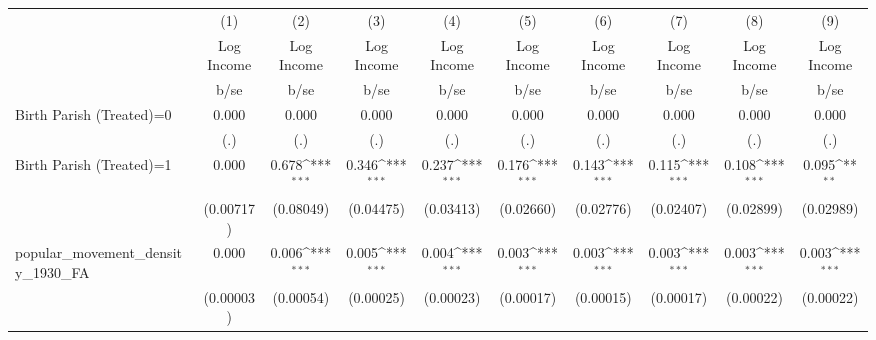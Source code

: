 {
\def\sym#1{\ifmmode^{#1}\else\(^{#1}\)\fi}
\begin{tabular}{l*{9}{c}}
\hline\hline
                    &\multicolumn{1}{c}{(1)}&\multicolumn{1}{c}{(2)}&\multicolumn{1}{c}{(3)}&\multicolumn{1}{c}{(4)}&\multicolumn{1}{c}{(5)}&\multicolumn{1}{c}{(6)}&\multicolumn{1}{c}{(7)}&\multicolumn{1}{c}{(8)}&\multicolumn{1}{c}{(9)}\\
                    &\multicolumn{1}{c}{Log Income}&\multicolumn{1}{c}{Log Income}&\multicolumn{1}{c}{Log Income}&\multicolumn{1}{c}{Log Income}&\multicolumn{1}{c}{Log Income}&\multicolumn{1}{c}{Log Income}&\multicolumn{1}{c}{Log Income}&\multicolumn{1}{c}{Log Income}&\multicolumn{1}{c}{Log Income}\\
                    &        b/se         &        b/se         &        b/se         &        b/se         &        b/se         &        b/se         &        b/se         &        b/se         &        b/se         \\
\hline
Birth Parish (Treated)=0&       0.000         &       0.000         &       0.000         &       0.000         &       0.000         &       0.000         &       0.000         &       0.000         &       0.000         \\
                    &         (.)         &         (.)         &         (.)         &         (.)         &         (.)         &         (.)         &         (.)         &         (.)         &         (.)         \\
Birth Parish (Treated)=1&       0.000         &       0.678\sym{***}&       0.346\sym{***}&       0.237\sym{***}&       0.176\sym{***}&       0.143\sym{***}&       0.115\sym{***}&       0.108\sym{***}&       0.095\sym{**} \\
                    &   (0.00717)         &   (0.08049)         &   (0.04475)         &   (0.03413)         &   (0.02660)         &   (0.02776)         &   (0.02407)         &   (0.02899)         &   (0.02989)         \\
popular\_movement\_density\_1930\_FA&       0.000         &       0.006\sym{***}&       0.005\sym{***}&       0.004\sym{***}&       0.003\sym{***}&       0.003\sym{***}&       0.003\sym{***}&       0.003\sym{***}&       0.003\sym{***}\\
                    &   (0.00003)         &   (0.00054)         &   (0.00025)         &   (0.00023)         &   (0.00017)         &   (0.00015)         &   (0.00017)         &   (0.00022)         &   (0.00022)         \\

\end{tabular}}
